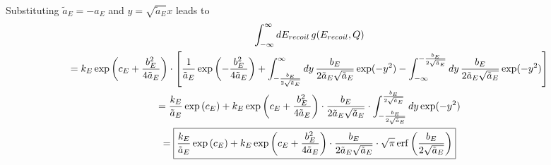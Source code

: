 Substituting $\tilde{a}_E = - a_E$ and $ y = \sqrt{\tilde{a}_E} x$ leads to
\begin{gather}
\int_{-\infty}^{\infty} dE_{recoil} \, g(E_{recoil},Q) \\
= k_E \exp \left( c_E + \frac{b_E^2}{4 \tilde{a}_E} \right) \cdot \left[
 \frac{1}{\tilde{a}_E} \exp \left( - \frac{b_E^2}{4 \tilde{a}_E} \right)
+ \int_{- \frac{b_E}{2 \sqrt{\tilde{a}_E}}}^{\infty} dy \, \frac{b_E}{2 \tilde{a}_E
\sqrt{\tilde{a}_E}} \exp ( - y^2)
- \int_{-\infty}^{- \frac{b_E}{2 \sqrt{\tilde{a}_E}}} dy \, 
\frac{b_E}{2 \tilde{a}_E \sqrt{\tilde{a}_E}} \exp ( -y^2) 
\right] \\
= \frac{k_E}{\tilde{a}_E} \exp \left( c_E \right) 
+ k_E \exp \left( c_E + \frac{b_E^2}{4 \tilde{a}_E} \right)
\cdot \frac{b_E}{2 \tilde{a}_E \sqrt{\tilde{a}_E}} \cdot
 \int_{- \frac{b_E}{2 \sqrt{\tilde{a}_E}}}^{\frac{b_E}{2 \sqrt{\tilde{a}_E}}}
dy \exp( - y^2) \\
= \framebox{$\displaystyle \frac{k_E}{\tilde{a}_E} \exp \left( c_E \right) 
+ k_E \exp \left( c_E + \frac{b_E^2}{4 \tilde{a}_E} \right)
\cdot \frac{b_E}{2 \tilde{a}_E \sqrt{\tilde{a}_E}} \cdot \sqrt{\pi}
\operatorname{erf} \left( \frac{b_E}{2 \sqrt{\tilde{a}_E}} \right)$}
\end{gather}

